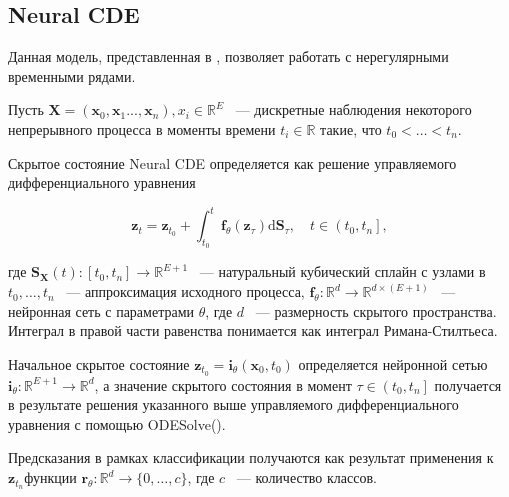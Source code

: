 \documentclass{article}
\newcommand{\R}{\mathbb{R}}
\begin{document}
\subsection{Neural CDE}

Данная модель, представленная в \cite{cde}, позволяет работать с нерегулярными временными рядами.

Пусть $\mathbf{X} = (\mathbf{x}_0, \mathbf{x}_1 ..., \mathbf{x}_n), x_i \in \mathbb{R}^E$ ~--- дискретные наблюдения некоторого непрерывного процесса в моменты времени $t_i\in \mathbb{R}$ такие, что $t_0 < \dots < t_n$. 

Скрытое состояние Neural CDE определяется как решение управляемого дифференциального уравнения 

$$
\mathbf{z}_{t}=\mathbf{z}_{t_{0}}+\int_{t_{0}}^{t} \mathbf{f}_{\theta}\left(\mathbf{z}_{\tau}\right) \mathrm{d} \mathbf{S}_{\tau}, \quad t \in\left(t_{0}, t_{n}\right],
$$

где $\mathbf{S}_\mathbf{X}(t) : \left[t_0, t_n \right] \rightarrow \mathbb{R}^{E+1}$ ~--- натуральный кубический сплайн с узлами в $t_0, \dots, t_n$ ~--- аппроксимация исходного процесса, $\mathbf{f}_{\theta}: \mathbb{R}^{d} \rightarrow \mathbb{R}^{d\times(E+1)}$ ~--- нейронная сеть с параметрами $\theta$, где $d$ ~--- размерность скрытого пространства. Интеграл в правой части равенства понимается как интеграл Римана-Стилтьеса.

Начальное скрытое состояние $\mathbf{z}_{t_0} = \mathbf{i}_{\theta}(\mathbf{x}_0, t_0)$ определяется нейронной сетью $\mathbf{i}_{\theta}: \R^{E+1} \rightarrow \R^{d}$, а значение скрытого состояния в момент $\tau \in\left(t_0, t_n\right]$ получается в результате решения указанного выше управляемого дифференциального уравнения с помощью ODESolve().

Предсказания в рамках классификации получаются как результат применения к $\mathbf{z}_{t_n} $функции $\mathbf{r}_{\theta} : \R^{d} \rightarrow \{0, \dots, c\}$, где $c$ ~--- количество классов. 




\end{document}
